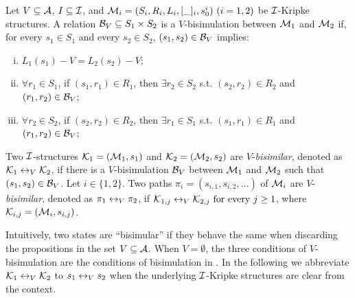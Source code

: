 \documentclass[twoside,11pt]{article}
\begin{document}
\begin{definition}[$V$-bisimulation]
	\label{def:VInd:bisimulation}
    Let $V\subseteq\cal A$, $I\subseteq {\cal I}$, and ${\cal M}_i=(S_i, R_i,L_i, [\_]_i, s_0^i)~(i=1,2)$ be ${\cal I}$-Kripke structures.
    A relation ${\cal B}_V \subseteq S_1 \times S_2$ is a $V$-bisimulation between ${\cal M}_1$ and ${\cal M}_2$
    if, for every $s_1 \in S_1$ and every $s_2 \in S_2$, $(s_1, s_2)\in {\cal B}_V$  implies:
    \begin{enumerate}[(i)]
        \item $L_1(s_1) - V = L_2(s_2) -V$;
        \item $\forall r_1\in S_1$, if $(s_1, r_1)\in R_1$, then $\exists r_2 \in S_2$ s.t. $(s_2,r_2) \in R_2$ and $(r_1, r_2) \in {\cal B}_V$;
        \item $\forall r_2\in S_2$, if $(s_2, r_2)\in R_2$, then $\exists r_1 \in S_1$ s.t. $(s_1,r_1) \in R_1$ and $(r_1, r_2)\in {\cal B}_V$;
    \end{enumerate}
\end{definition}


Two ${\cal I}$-structures ${\cal K}_1 = ({\cal M}_1, s_1)$ and ${\cal K}_2 = ({\cal M}_2, s_2)$ are $V$-{\em bisimilar},
denoted as ${\cal K}_1 \leftrightarrow_V {\cal K}_2$, if there is a $V$-bisimulation ${\cal B}_V$ between
${\cal M}_1$ and ${\cal M}_2$ such that $(s_1, s_2)\in {\cal B}_V$. %
Let $i\in \{1,2\}$. Two paths $\pi_i=(s_{i,1},s_{i,2},\ldots)$ of ${\cal M}_i$
	are $V$-{\em bisimilar}, denoted as $\pi_1 \leftrightarrow_V \pi_2$, if
	$ {\cal K}_{1,j} \leftrightarrow_V {\cal K}_{2,j}\mbox { for every $j \ge 1$}$, %
	where ${\cal K}_{i,j}=({\cal M}_i,s_{i,j})$.

Intuitively, two states  are ``bisimular''  if they behave the same when discarding the propositions
in the set $V\subseteq\cal A$.
When $V=\emptyset$, the three conditions of $V$-bisimulation are the conditions of bisimulation in \CTL.
%
In the following we abbreviate ${\cal K}_1 \leftrightarrow_V {\cal K}_2$ to $s_1 \leftrightarrow_V s_2$ when the underlying ${\cal I}$-Kripke structures are clear from the context.

\end{document}
